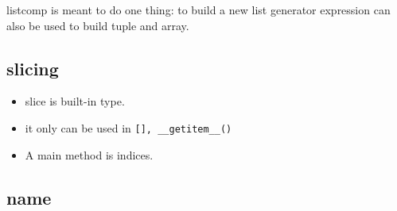 \documentclass[a4paper,12pt,twoside]{book}
\begin{document}
listcomp is meant to do one thing: to build a new list
generator expression can also be used to build tuple and array.


\subsection{slicing}
\begin{itemize}
	\item slice is built-in type.
	\item it only can be used in \verb|[], __getitem__()|
	\item A main method is indices. 
\end{itemize}


\subsection{name}
\end{document}
